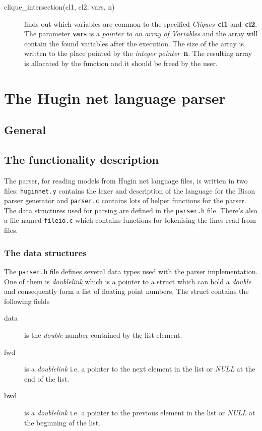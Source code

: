 \documentclass[12pt,a4paper]{report}
\newcommand{\cdatatype}[1]{{\it #1}}
\newcommand{\cfilename}[1]{\texttt{#1}}
\newcommand{\cparameter}[1]{\textbf{#1}}
\begin{document}
\begin{description}
\item[clique\_intersection(cl1, cl2, vars, n)] finds out which
variables are common to the specified \cdatatype{Cliques}~\cparameter{cl1}
and~\cparameter{cl2}. The parameter \cparameter{vars} is a 
\cdatatype{pointer to an array of Variables} and the array will 
contain the found variables  after the execution. The size of the
array is written to the place pointed by the 
\cdatatype{integer pointer}~\cparameter{n}. The resulting array
is allocated by the function and it should be freed by the user.
\end{description}


\newpage
\section{The Hugin net language parser}
\subsection{General}



\subsection{The functionality description}
The parser, for reading models from Hugin net language files, is
written in two files: \cfilename{huginnet.y} contains the lexer and 
description of the language for the Bison parser generator and 
\cfilename{parser.c} contains lots of helper functions for the parser. 
The data structures used for parsing are defined in the
\cfilename{parser.h} file. There's also a file named
\cfilename{fileio.c} which contains functions for tokenising the 
lines read from files.

\subsubsection{The data structures}
The \cfilename{parser.h} file defines several data types used with the
parser implementation. One of them is \cdatatype{doublelink} which is a
pointer to a struct which can hold a \cdatatype{double} and consequently
form a list of floating point numbers. The struct contains the
following fields
\begin{description}
\item[data] is the \cdatatype{double} number contained by the list element.

\item[fwd] is a \cdatatype{doublelink} i.e. a pointer to the next element in
the list or \cdatatype{NULL} at the end of the list.

\item[bwd] is a \cdatatype{doublelink} i.e. a pointer to the previous
element in the list or \cdatatype{NULL} at the beginning of the list.
\end{description}
\end{document}
